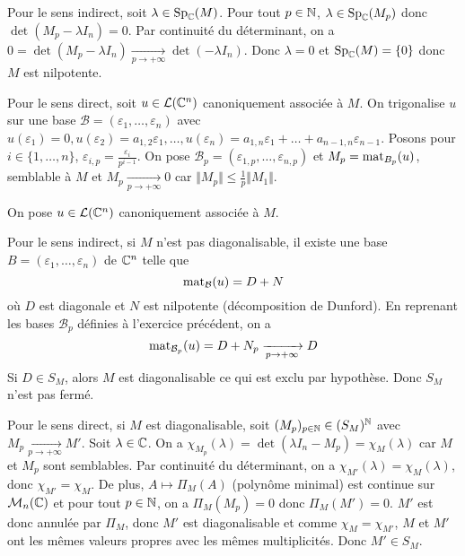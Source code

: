 \begin{solution}
	Pour le sens indirect, soit $\lambda\in\operatorname{Sp}_{\mathbb{C}}(M)$. Pour tout $p\in\mathbb{N}$, $\lambda\in\operatorname{Sp}_{\mathbb{C}}(M_{p})$ donc $\det(M_{p}-\lambda I_{n})=0$. Par continuité du déterminant, on a $0=\det(M_{p}-\lambda I_{n})\xrightarrow[p\to+\infty]{}\det(-\lambda I_{n})$. Donc $\lambda=0$ et $\operatorname{Sp}_{\mathbb{C}}(M)=\{0\}$ donc $M$ est nilpotente.

	Pour le sens direct, soit $u\in\mathcal{L}(\mathbb{C}^{n})$ canoniquement associée à $M$. On trigonalise $u$ sur une base $\mathcal{B}=(\varepsilon_{1},\dots,\varepsilon_{n})$ avec $u(\varepsilon_{1})=0,u(\varepsilon_{2})=a_{1,2}\varepsilon_{1},\dots,u(\varepsilon_{n})=a_{1,n}\varepsilon_{1}+\dots+a_{n-1,n}\varepsilon_{n-1}$. Posons pour $i\in\{1,\dots,n\}$, $\varepsilon_{i,p}=\frac{\varepsilon_{i}}{p^{i-1}}$. On pose $\mathcal{B}_{p}=(\varepsilon_{1,p},\dots,\varepsilon_{n,p})$ et $M_{p}=\operatorname{mat}\limits_{B_{p}}(u)$, semblable à $M$ et $M_{p}\xrightarrow[p\to+\infty]{}0$ car $\Vert M_{p}\Vert\leqslant\frac{1}{p}\Vert M_{1}\Vert$.
\end{solution}

\begin{solution}
	On pose $u\in\mathcal{L}(\mathbb{C}^{n})$ canoniquement associée à $M$. 

	Pour le sens indirect, si $M$ n'est pas diagonalisable, il existe une base $B=(\varepsilon_{1},\dots,\varepsilon_{n})$ de $\mathbb{C}^{n}$ telle que 
	$$\operatorname{mat}\limits_{\mathcal{B}}(u)=D+N$$
	où $D$ est diagonale et $N$ est nilpotente (décomposition de Dunford). En reprenant les bases $\mathcal{B}_{p}$ définies à l'exercice précédent, on a
	$$\operatorname{mat}\limits_{\mathcal{B}_{p}}(u)=D+N_{p}\xrightarrow[p\to+\infty]{}D$$
	Si $D\in S_{M}$, alors $M$ est diagonalisable ce qui est exclu par hypothèse. Donc $S_{M}$ n'est pas fermé.

	Pour le sens direct, si $M$ est diagonalisable, soit $(M_{p})_{p\in\mathbb{N}}\in(S_{M})^{\mathbb{N}}$ avec $M_{p}\xrightarrow[p\to+\infty]{}M'$. Soit $\lambda\in\mathbb{C}$. On a $\chi_{M_{p}}(\lambda)=\det(\lambda I_{n}-M_{p})=\chi_{M}(\lambda)$ car $M$ et $M_{p}$ sont semblables. Par continuité du déterminant, on a $\chi_{M'}(\lambda)=\chi_{M}(\lambda)$, donc $\chi_{M'}=\chi_{M}$. De plus, $A\mapsto\Pi_{M}(A)$ (polynôme minimal) est continue sur $\mathcal{M}_{n}(\mathbb{C})$ et pour tout $p\in\mathbb{N}$, on a $\Pi_{M}(M_{p})=0$ donc $\Pi_{M}(M')=0$. $M'$ est donc annulée par $\Pi_{M}$, donc $M'$ est diagonalisable et comme $\chi_{M}=\chi_{M'}$, $M$ et $M'$ ont les mêmes valeurs propres avec les mêmes multiplicités. Donc $M'\in S_{M}$.
\end{solution}


